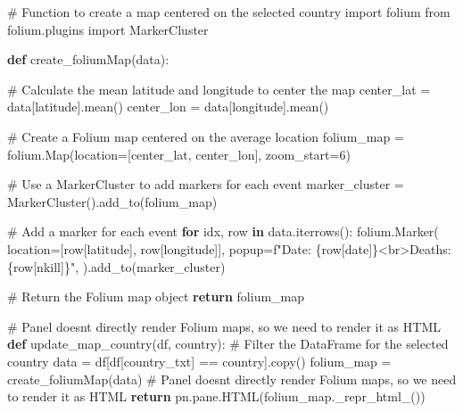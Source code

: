 \documentclass[
  letterpaper,
  DIV=11,
  numbers=noendperiod]{scrreprt}
\newenvironment{Shaded}{\begin{snugshade}}{\end{snugshade}}
\newcommand{\CommentTok}[1]{\textcolor[rgb]{0.37,0.37,0.37}{#1}}
\newcommand{\ControlFlowTok}[1]{\textcolor[rgb]{0.00,0.23,0.31}{\textbf{#1}}}
\newcommand{\DecValTok}[1]{\textcolor[rgb]{0.68,0.00,0.00}{#1}}
\newcommand{\ImportTok}[1]{\textcolor[rgb]{0.00,0.46,0.62}{#1}}
\newcommand{\KeywordTok}[1]{\textcolor[rgb]{0.00,0.23,0.31}{\textbf{#1}}}
\newcommand{\NormalTok}[1]{\textcolor[rgb]{0.00,0.23,0.31}{#1}}
\newcommand{\OperatorTok}[1]{\textcolor[rgb]{0.37,0.37,0.37}{#1}}
\newcommand{\SpecialCharTok}[1]{\textcolor[rgb]{0.37,0.37,0.37}{#1}}
\newcommand{\SpecialStringTok}[1]{\textcolor[rgb]{0.13,0.47,0.30}{#1}}
\newcommand{\StringTok}[1]{\textcolor[rgb]{0.13,0.47,0.30}{#1}}
\begin{document}
\begin{Shaded}
\begin{Highlighting}[]
\CommentTok{\# Function to create a map centered on the selected country}
\ImportTok{import}\NormalTok{ folium}
\ImportTok{from}\NormalTok{ folium.plugins }\ImportTok{import}\NormalTok{ MarkerCluster}

\KeywordTok{def}\NormalTok{ create\_foliumMap(data):}

    \CommentTok{\# Calculate the mean latitude and longitude to center the map}
\NormalTok{    center\_lat }\OperatorTok{=}\NormalTok{ data[}\StringTok{\textquotesingle{}latitude\textquotesingle{}}\NormalTok{].mean()}
\NormalTok{    center\_lon }\OperatorTok{=}\NormalTok{ data[}\StringTok{\textquotesingle{}longitude\textquotesingle{}}\NormalTok{].mean()}

    \CommentTok{\# Create a Folium map centered on the average location}
\NormalTok{    folium\_map }\OperatorTok{=}\NormalTok{ folium.Map(location}\OperatorTok{=}\NormalTok{[center\_lat, center\_lon], zoom\_start}\OperatorTok{=}\DecValTok{6}\NormalTok{)}

    \CommentTok{\# Use a MarkerCluster to add markers for each event}
\NormalTok{    marker\_cluster }\OperatorTok{=}\NormalTok{ MarkerCluster().add\_to(folium\_map)}

    \CommentTok{\# Add a marker for each event}
    \ControlFlowTok{for}\NormalTok{ idx, row }\KeywordTok{in}\NormalTok{ data.iterrows():}
\NormalTok{        folium.Marker(}
\NormalTok{            location}\OperatorTok{=}\NormalTok{[row[}\StringTok{\textquotesingle{}latitude\textquotesingle{}}\NormalTok{], row[}\StringTok{\textquotesingle{}longitude\textquotesingle{}}\NormalTok{]],}
\NormalTok{            popup}\OperatorTok{=}\SpecialStringTok{f"Date: }\SpecialCharTok{\{}\NormalTok{row[}\StringTok{\textquotesingle{}date\textquotesingle{}}\NormalTok{]}\SpecialCharTok{\}}\SpecialStringTok{\textless{}br\textgreater{}Deaths: }\SpecialCharTok{\{}\NormalTok{row[}\StringTok{\textquotesingle{}nkill\textquotesingle{}}\NormalTok{]}\SpecialCharTok{\}}\SpecialStringTok{"}\NormalTok{,}
\NormalTok{        ).add\_to(marker\_cluster)}

    \CommentTok{\# Return the Folium map object}
    \ControlFlowTok{return}\NormalTok{ folium\_map}
    
\CommentTok{\# Panel doesn\textquotesingle{}t directly render Folium maps, so we need to render it as HTML}
\KeywordTok{def}\NormalTok{ update\_map\_country(df, country):}
    \CommentTok{\# Filter the DataFrame for the selected country}
\NormalTok{    data }\OperatorTok{=}\NormalTok{ df[df[}\StringTok{\textquotesingle{}country\_txt\textquotesingle{}}\NormalTok{] }\OperatorTok{==}\NormalTok{ country].copy()}
\NormalTok{    folium\_map }\OperatorTok{=}\NormalTok{ create\_foliumMap(data)}
    \CommentTok{\# Panel doesn\textquotesingle{}t directly render Folium maps, so we need to render it as HTML}
    \ControlFlowTok{return}\NormalTok{ pn.pane.HTML(folium\_map.\_repr\_html\_())}
    

\end{Highlighting}
\end{Shaded}
\end{document}
